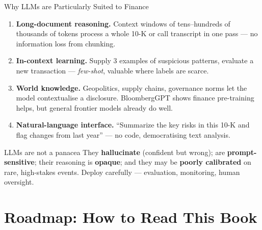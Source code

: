 \documentclass[9pt,t]{beamer}
\begin{document}
\begin{frame}{Why LLMs are Particularly Suited to Finance}

\begin{enumerate}
  \item \textbf{Long-document reasoning.} Context windows of tens--hundreds of
        thousands of tokens process a whole 10-K or call transcript in one pass ---
        no information loss from chunking.
  \item \textbf{In-context learning.} Supply 3 examples of suspicious patterns,
        evaluate a new transaction --- \emph{few-shot}, valuable where labels are scarce.
  \item \textbf{World knowledge.} Geopolitics, supply chains, governance norms let
        the model contextualise a disclosure. BloombergGPT shows finance
        pre-training helps, but general frontier models already do well.
  \item \textbf{Natural-language interface.} ``Summarize the key risks in this
        10-K and flag changes from last year'' --- no code, democratising text analysis.
\end{enumerate}

\medskip
\begin{alertblock}{LLMs are not a panacea}
They \textbf{hallucinate} (confident but wrong); are \textbf{prompt-sensitive};
their reasoning is \textbf{opaque}; and they may be \textbf{poorly calibrated} on
rare, high-stakes events. Deploy carefully --- evaluation, monitoring, human oversight.
\end{alertblock}
\end{frame}

\section{Roadmap: How to Read This Book}
\end{document}
